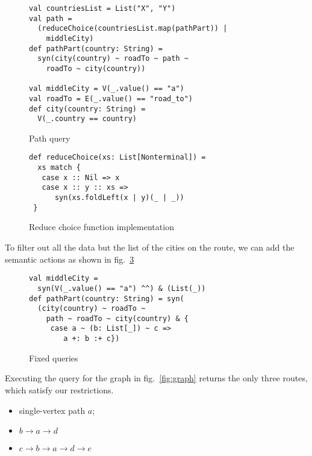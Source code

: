 \begin{figure}[h]
\begin{lstlisting}
val countriesList = List("X", "Y")
val path =
  (reduceChoice(countriesList.map(pathPart)) |
    middleCity)
def pathPart(country: String) =
  syn(city(country) ~ roadTo ~ path ~
    roadTo ~ city(country))

val middleCity = V(_.value() == "a")
val roadTo = E(_.value() == "road_to")
def city(country: String) =
  V(_.country == country)
\end{lstlisting}
\caption{Path query}
\label{fig:pathQuery}
\end{figure}

\begin{figure}[h]
\begin{lstlisting}
def reduceChoice(xs: List[Nonterminal]) =
  xs match {
   case x :: Nil => x
   case x :: y :: xs =>
      syn(xs.foldLeft(x | y)(_ | _))
 }
\end{lstlisting}
\caption{Reduce choice function implementation}
\label{fig:reduceChoice}
\end{figure}

To filter out all the data but the list of the cities on the route, we can add the semantic actions as shown in fig.~\ref{fig:fixedPathQ}


\begin{figure}[h]
\begin{lstlisting}
val middleCity =
  syn(V(_.value() == "a") ^^) & (List(_))
def pathPart(country: String) = syn(
  (city(country) ~ roadTo ~
    path ~ roadTo ~ city(country) & {
     case a ~ (b: List[_]) ~ c =>
        a +: b :+ c})
\end{lstlisting}
\caption{Fixed queries}
\label{fig:fixedPathQ}
\end{figure}

Executing the query for the graph in fig.~\ref{fig:graph} returns the only three routes, which satisfy our restrictions. 

\begin{itemize}
\item single-vertex path $a$;
\item $b \rightarrow a \rightarrow d$
\item $c \rightarrow b \rightarrow a \rightarrow d \rightarrow e$
\end{itemize}

